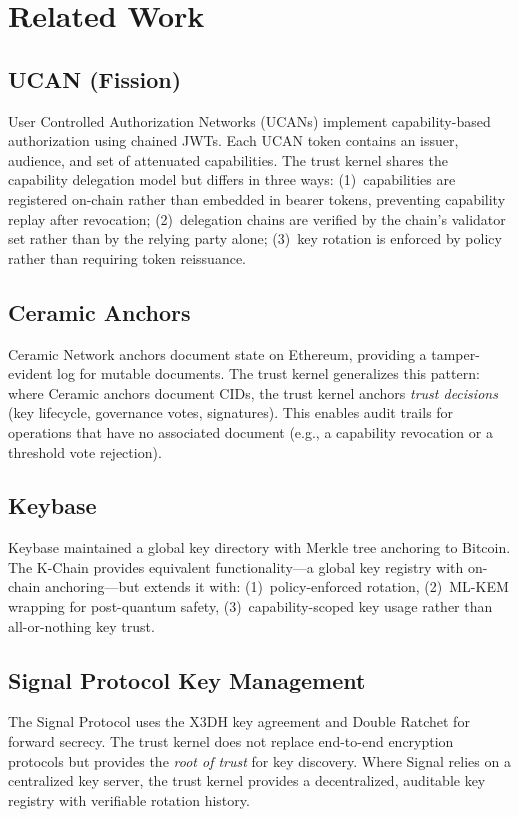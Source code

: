 \section{Related Work}
\label{sec:related}

\subsection{UCAN (Fission)}

User Controlled Authorization Networks (UCANs) \cite{ucan-fission} implement
capability-based authorization using chained JWTs. Each UCAN token contains
an issuer, audience, and set of attenuated capabilities. The trust kernel
shares the capability delegation model but differs in three ways:
(1)~capabilities are registered on-chain rather than embedded in bearer tokens,
preventing capability replay after revocation;
(2)~delegation chains are verified by the chain's validator set rather than
by the relying party alone;
(3)~key rotation is enforced by policy rather than requiring token reissuance.

\subsection{Ceramic Anchors}

Ceramic Network \cite{ceramic-anchors} anchors document state on Ethereum,
providing a tamper-evident log for mutable documents. The trust kernel
generalizes this pattern: where Ceramic anchors document CIDs, the trust
kernel anchors \emph{trust decisions} (key lifecycle, governance votes,
signatures). This enables audit trails for operations that have no associated
document (e.g., a capability revocation or a threshold vote rejection).

\subsection{Keybase}

Keybase \cite{keybase} maintained a global key directory with Merkle tree
anchoring to Bitcoin. The K-Chain provides equivalent functionality---a
global key registry with on-chain anchoring---but extends it with:
(1)~policy-enforced rotation,
(2)~ML-KEM wrapping for post-quantum safety,
(3)~capability-scoped key usage rather than all-or-nothing key trust.

\subsection{Signal Protocol Key Management}

The Signal Protocol \cite{signal-protocol} uses the X3DH key agreement and
Double Ratchet for forward secrecy. The trust kernel does not replace
end-to-end encryption protocols but provides the \emph{root of trust} for
key discovery. Where Signal relies on a centralized key server, the trust
kernel provides a decentralized, auditable key registry with verifiable
rotation history.

